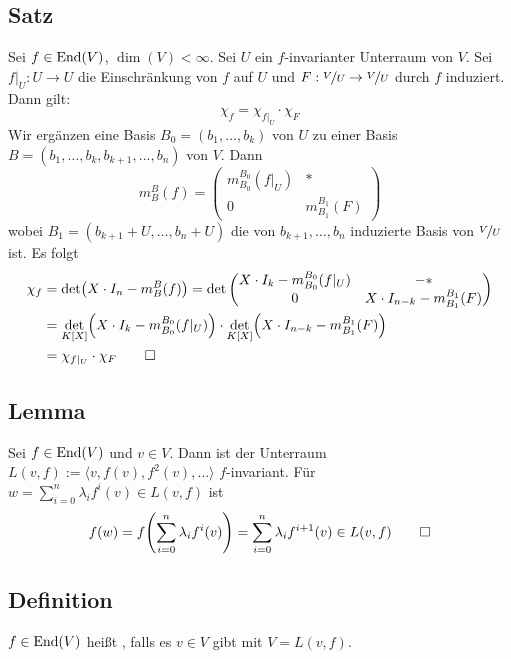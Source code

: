 \subsection[Satz über Zerlegung des charakteristischen Polynoms mit Hilfe von Unterräumen]{Satz} %
\label{sub:611}
Sei $f \in \operatorname{End}(V)$, $\dim (V)< \infty$. Sei $U$ ein $f$-invarianter Unterraum von $V$. Sei $f|_{U} : U \to U$ die Einschränkung von $f$ auf $U$ und 
$F: \nicefrac{V}{U} \to \nicefrac{V}{U}$ durch $f$ induziert. Dann gilt:
\[
	\chi_f = \chi_{f|_U} \cdot  \chi_F
\]
Wir ergänzen eine Basis $B_0 = (b_1, \ldots , b_k)$ von $U$ zu einer Basis $B=(b_1, \ldots , b_k, b_{k+1}, \ldots , b_n)$ von $V$. Dann 
\[
	m_B^B(f) = \begin{pmatrix}
		m_{B_0}^{B_0}(f|_U) & * \\
		0 & m_{B_1}^{B_1}(F)
	\end{pmatrix}
\]
wobei $B_1 = (b_{k+1} + U , \ldots , b_n + U)$ die von $b_{k+1}, \ldots , b_n$ induzierte Basis von $\nicefrac{V}{U}$ ist. Es folgt
\begin{align*}
	\chi_f &= \det \enbrace*{X \cdot  I_n - m_{B}^{B}(f)} = \det {\begin{pmatrix}
		X \cdot  I_k - m_{B_0}^{B_0}(f|_{U}) &  -* \\
		0 & X \cdot I_{n-k} - m_{B_1}^{B_1}(F)
	\end{pmatrix}} \\
	&= \det_{K[X]} \enbrace*{X \cdot  I_k - m_{B_0}^{B_0} (f|_U)} \cdot \det_{K[X]} \enbrace*{X \cdot  I_{n-k} - m_{B_1}^{B_1} (F)} \\
	&= \chi_{f|_U} \cdot  \chi_{F} \tag*{$\square$} 
\end{align*}

\subsection[Lemma: $L(v,f)$ ist invariant]{Lemma} %
\label{sub:612}
Sei $f \in \operatorname{End}(V)$ und $v \in V$. Dann ist der Unterraum $L(v,f) := \langle v, f(v), f^2 (v), \ldots \rangle$ $f$-invariant.
Für $w= \sum_{i=0}^{n} \lambda_i f^i (v) \in L(v,f)$ ist 
\[
	f(w) = f \enbrace*{\sum_{i=0}^{n} \lambda_i f^i (v)} = \sum_{i=0}^{n} \lambda_i f^{i+1}(v) \in L(v,f) \tag*{$\square$}
\] 

\subsection[Definition: zyklischer Endomorphismus]{Definition} %
\label{sub:613}
$f \in \operatorname{End}(V)$ heißt , falls es $v \in V$ gibt mit $V=L(v,f)$. 

